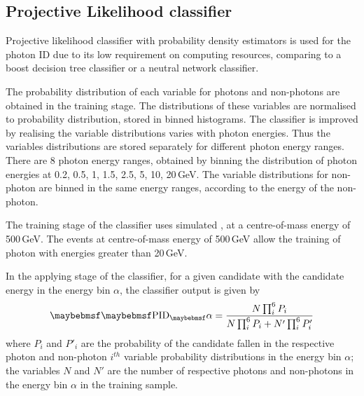
\subsection{Projective Likelihood classifier}


Projective likelihood classifier  with probability density estimators is used  for the photon ID due to its  low requirement on computing resources, comparing to a boost decision tree classifier or a neutral network classifier.

The probability distribution of each variable for photons and non-photons are obtained in the training stage. The distributions of these variables are normalised to probability distribution, stored in binned histograms. The classifier is improved by realising the variable distributions varies with photon energies. Thus the variables distributions are stored separately for different photon energy ranges. There are 8 photon energy ranges, obtained by binning the distribution of photon energies at 0.2, 0.5, 1, 1.5, 2.5, 5, 10, 20\,GeV. The variable distributions for non-photon are binned in the same energy ranges, according to the energy of the non-photon.

The training stage of the classifier uses simulated  \eeZuds, at a centre-of-mass energy of 500\,GeV. The events at centre-of-mass energy of 500\,GeV allow the training of photon with energies greater than 20\,GeV.


In the applying stage of the classifier, for a given candidate with the candidate energy in the  energy bin $\alpha$, the classifier output is given by
\begin{equation}
\uprightMath{PID_\alpha} = \frac{N \prod_{i}^6{P_{i}}}{N \prod_{i}^6{P_{i}} + N' \prod_{i}^6{P'_{i}}}
\end{equation}
where $P_{i}$ and $P'_{i}$ are the probability of the candidate fallen in the  respective photon and non-photon $i^{th}$ variable probability distributions  in the energy bin $\alpha$; the variables $N$ and $N'$ are the number of respective photons and non-photons in the energy bin $\alpha$ in the training sample.


